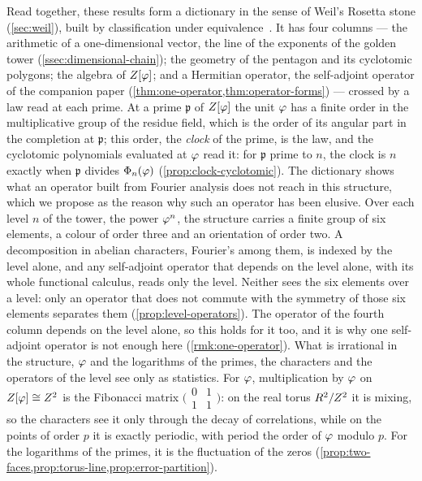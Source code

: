 Read together, these results form a dictionary in the sense of Weil's Rosetta stone (\cref{sec:weil}), built by
classification under equivalence~\cite{gonzalez26cw}.  It has four columns --- the arithmetic of a one-dimensional
vector, the line of the exponents of the golden tower (\cref{ssec:dimensional-chain}); the geometry of the pentagon and
its cyclotomic polygons; the algebra of $Z[\varphi]$; and a Hermitian operator, the self-adjoint operator of the companion paper (\cref{thm:one-operator,thm:operator-forms}) --- crossed by a law read at each prime.  At a prime $\mathfrak p$ of $Z[\varphi]$ the unit $\varphi$ has a finite order in
the multiplicative group of the residue field, which is the order of its angular part in the completion at
$\mathfrak p$; this order, the \emph{clock} of the prime, is the law, and the cyclotomic polynomials evaluated at
$\varphi$ read it: for $\mathfrak p$ prime to $n$, the clock is $n$ exactly when $\mathfrak p$ divides
$\Phi_n(\varphi)$ (\cref{prop:clock-cyclotomic}).  The dictionary shows what an operator built from Fourier analysis does not reach in this structure, which we
propose as the reason why such an operator has been elusive.  Over each level $n$ of the tower, the power $\varphi^n$, the structure carries a finite
group of six elements, a colour of order three and an orientation of order two.  A decomposition in abelian characters, Fourier's among them, is indexed by the level alone, and any
self-adjoint operator that depends on the level alone, with its whole functional calculus, reads only the level.
Neither sees the six elements over a level: only an operator that does not commute with the symmetry of those six
elements separates them (\cref{prop:level-operators}).  The operator of the fourth column depends on the level alone, so this
holds for it too, and it is why one self-adjoint operator is not enough here (\cref{rmk:one-operator}).  What is irrational in the structure, $\varphi$ and the logarithms of the primes, the characters and the
operators of the level see only as statistics.  For
$\varphi$, multiplication by $\varphi$ on $Z[\varphi]\cong Z^2$ is the Fibonacci matrix
$\bigl(\begin{smallmatrix}0&1\\1&1\end{smallmatrix}\bigr)$: on the real torus $R^2/Z^2$ it is mixing, so the
characters see it only through the decay of correlations, while on the points of order $p$ it is exactly periodic,
with period the order of $\varphi$ modulo $p$.  For the logarithms of the primes, it is the fluctuation of the zeros
(\cref{prop:two-faces,prop:torus-line,prop:error-partition}).

